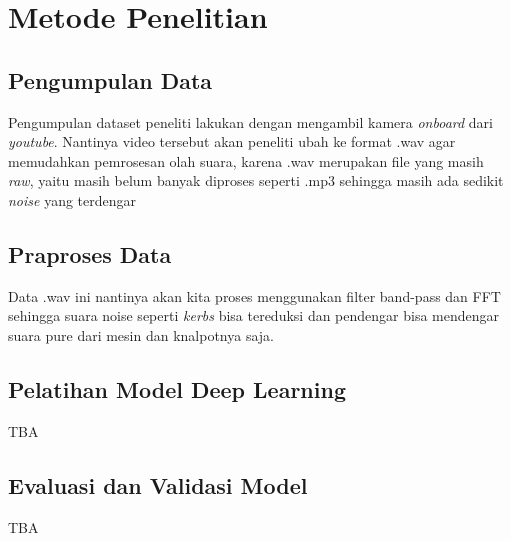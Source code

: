 \section{Metode Penelitian}

\subsection{Pengumpulan Data}

Pengumpulan dataset peneliti lakukan dengan mengambil kamera \textit{onboard} dari \textit{youtube}. Nantinya video tersebut akan peneliti ubah ke format .wav agar memudahkan pemrosesan olah suara, karena .wav merupakan file yang masih \textit{raw}, yaitu masih belum banyak diproses seperti .mp3 sehingga masih ada sedikit \textit{noise} yang terdengar 

\subsection{Praproses Data}

Data .wav ini nantinya akan kita proses menggunakan filter band-pass dan FFT sehingga suara noise seperti \textit{kerbs} bisa tereduksi dan pendengar bisa mendengar suara pure dari mesin dan knalpotnya saja.  

\subsection{Pelatihan Model Deep Learning}

TBA

\subsection{Evaluasi dan Validasi Model}

TBA

\newpage